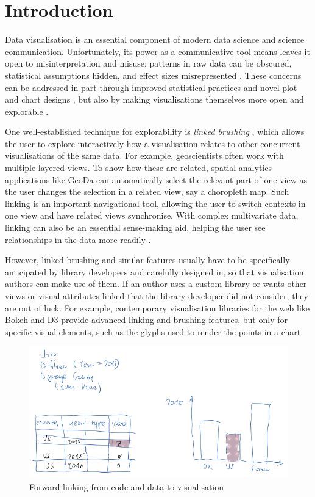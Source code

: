 \section{Introduction}

Data visualisation is an essential component of modern data science and science
communication. Unfortunately, its power as a communicative tool means leaves it
open to misinterpretation and misuse: patterns in raw data can be obscured,
statistical assumptions hidden, and effect sizes misrepresented
\cite{weissgerber15}. These concerns can be addressed in part through improved
statistical practices and novel plot and chart designs \cite{allen19}, but also
by making visualisations themselves more open and explorable
\cite{dragicevic19}.

One well-established technique for explorability is \emph{linked brushing}
\cite{fisherkeller75,becker87,buja91}, which allows the user to explore
interactively how a visualisation relates to other concurrent visualisations of
the same data. For example, geoscientists often work with multiple layered
views. To show how these are related, spatial analytics applications like GeoDa
\cite{anselin06} can automatically select the relevant part of one view as the
user changes the selection in a related view, say a choropleth map. Such linking
is an important navigational tool, allowing the user to switch contexts in one
view and have related views synchronise. With complex multivariate data, linking
can also be an essential sense-making aid, helping the user see relationships in
the data more readily \cite{he18}.

However, linked brushing and similar features usually have to be specifically
anticipated by library developers and carefully designed in, so that
visualisation authors can make use of them. If an author uses a custom library
or wants other views or visual attributes linked that the library developer did
not consider, they are out of luck. For example, contemporary visualisation
libraries for the web like Bokeh \cite{jolly18} and D3 \cite{bostock11} provide
advanced linking and brushing features, but only for specific visual elements,
such as the glyphs used to render the points in a chart.

\begin{figure}[h]
\includegraphics[scale=0.35]{image/chart-fwd}
\caption{Forward linking from code and data to visualisation}
\end{figure}

